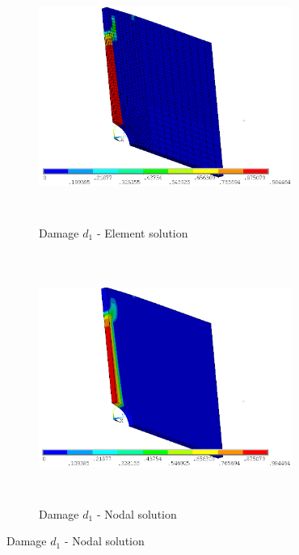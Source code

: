 \documentclass[12pt]{report}
\begin{document}
\begin{figure}[htbp!]
     \captionsetup[subfigure]{justification=centering}
     \begin{subfigure}[b]{0.4\textwidth}
         \includegraphics[width=8.3cm,height=8.2cm,keepaspectratio]{27.d1-lt-e.png}
         \caption{Damage $d_{1}$ - Element solution}
         \label{fig:d1-lt-e}
     \end{subfigure}
     \hspace{1.8cm}
     \begin{subfigure}[b]{0.4\textwidth}
         \includegraphics[width=8.3cm,height=8.2cm,keepaspectratio]{27.d1-lt-n.png}
         \caption{Damage $d_{1}$ - Nodal solution}
         \label{fig:d1-lt-n}
     \end{subfigure}
\end{figure}
\FloatBarrier
\end{document}

